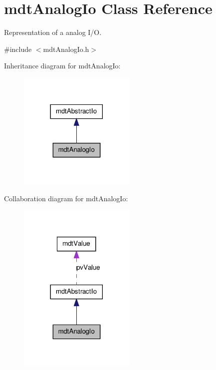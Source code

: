 \hypertarget{classmdt_analog_io}{
\section{mdtAnalogIo Class Reference}
\label{classmdt_analog_io}
}


Representation of a analog I/O.  




{\ttfamily \#include $<$mdtAnalogIo.h$>$}



Inheritance diagram for mdtAnalogIo:\nopagebreak
\begin{figure}[H]
\begin{center}
\leavevmode
\includegraphics[width=158pt]{classmdt_analog_io__inherit__graph}
\end{center}
\end{figure}


Collaboration diagram for mdtAnalogIo:
\nopagebreak
\begin{figure}[H]
\begin{center}
\leavevmode
\includegraphics[width=158pt]{classmdt_analog_io__coll__graph}
\end{center}
\end{figure}
